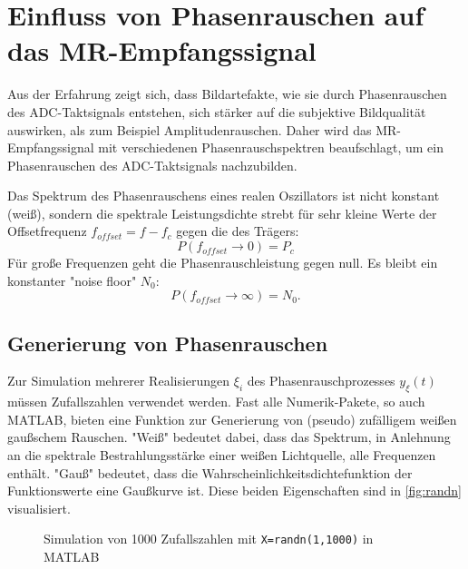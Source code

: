 \section{Einfluss von Phasenrauschen auf das MR-Empfangssignal}
Aus der Erfahrung zeigt sich, dass Bildartefakte, wie sie durch Phasenrauschen des ADC-Taktsignals entstehen, sich stärker auf die subjektive Bildqualität auswirken, als zum Beispiel Amplitudenrauschen. Daher wird das MR-Empfangssignal mit verschiedenen Phasenrauschspektren beaufschlagt, um ein Phasenrauschen des ADC-Taktsignals nachzubilden.

Das Spektrum des Phasenrauschens eines realen Oszillators ist nicht konstant (weiß), sondern die spektrale Leistungsdichte strebt für sehr kleine Werte der Offsetfrequenz $f_{offset}=f-f_c$ gegen die des Trägers:
\begin{equation}
P(f_{offset} \rightarrow 0) = P_c
\end{equation}
Für große Frequenzen geht die Phasenrauschleistung gegen null. Es bleibt ein konstanter "noise floor" $N_0$:
\begin{equation}
	P(f_{offset} \rightarrow \infty) = N_0.
\end{equation}

\subsection{Generierung von Phasenrauschen}
Zur Simulation mehrerer Realisierungen $\xi_i$ des Phasenrauschprozesses $y_\xi(t)$ müssen Zufallszahlen verwendet werden. Fast alle Numerik-Pakete, so auch MATLAB, bieten eine Funktion zur Generierung von (pseudo) zufälligem weißen gaußschem Rauschen. "Weiß" bedeutet dabei, dass das Spektrum, in Anlehnung an die spektrale Bestrahlungsstärke einer weißen Lichtquelle, alle Frequenzen enthält. "Gauß" bedeutet, dass die Wahrscheinlichkeitsdichtefunktion der Funktionswerte eine Gaußkurve ist. Diese beiden Eigenschaften sind in \autoref{fig:randn} visualisiert.

\begin{figure}[H]
	\centering
	\hfill
	\caption[MATLAB randn]{Simulation von 1000 Zufallszahlen mit \texttt{X=randn(1,1000)} in MATLAB}
	\label{fig:randn}
\end{figure}

